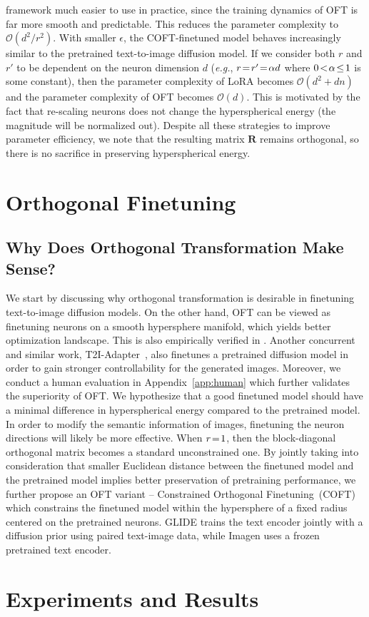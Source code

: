 \begin{itemize}[leftmargin=*,nosep]
\begin{itemize}[leftmargin=*,nosep]
framework much easier to use in practice, since the training dynamics of OFT is far more smooth and predictable. This reduces the parameter complexity to $\mathcal{O}(d^2/r^2)$. With smaller $\epsilon$, the COFT-finetuned model behaves increasingly similar to the pretrained text-to-image diffusion model. If we consider both $r$ and $r'$ to be dependent on the neuron dimension $d$ (\emph{e.g.}, $\thickmuskip=2mu \medmuskip=2mu r=r'=\alpha d$ where $\thickmuskip=2mu \medmuskip=2mu 0<\alpha\leq 1$ is some constant), then the parameter complexity of LoRA becomes $\mathcal{O}(d^2+dn)$ and the parameter complexity of OFT becomes $\mathcal{O}(d)$. This is motivated by the fact that re-scaling neurons does not change the hyperspherical energy (the magnitude will be normalized out). Despite all these strategies to improve parameter efficiency, we note that the resulting matrix $\bm{R}$ remains orthogonal, so there is no sacrifice in preserving hyperspherical energy. \section{Orthogonal Finetuning}

\subsection{Why Does Orthogonal Transformation Make Sense?}

We start by discussing why orthogonal transformation is desirable in finetuning text-to-image diffusion models. On the other hand, OFT can be viewed as finetuning neurons on a smooth hypersphere manifold, which yields better optimization landscape. This is also empirically verified in \cite{liu2021orthogonal}. Another concurrent and similar work, T2I-Adapter~\cite{mou2023t2i}, also finetunes a pretrained diffusion model in order to gain stronger controllability for the generated images. Moreover, we conduct a human evaluation in Appendix~\ref{app:human} which further validates the superiority of OFT. We hypothesize that a good finetuned model should have a minimal difference in hyperspherical energy compared to the pretrained model. In order to modify the semantic information of images, finetuning the neuron directions will likely be more effective. When $\thickmuskip=2mu \medmuskip=2mu r=1$, then the block-diagonal orthogonal matrix becomes a standard unconstrained one. By jointly taking into consideration that smaller Euclidean distance between the finetuned model and the pretrained model implies better preservation of pretraining performance, we further propose an OFT variant -- Constrained Orthogonal Finetuning~(COFT) which constrains the finetuned model within the hypersphere of a fixed radius centered on the pretrained neurons. GLIDE trains the text encoder jointly with a diffusion prior using paired text-image data, while Imagen uses a frozen pretrained text encoder. \section{Experiments and Results}


\end{itemize}
\end{itemize}
